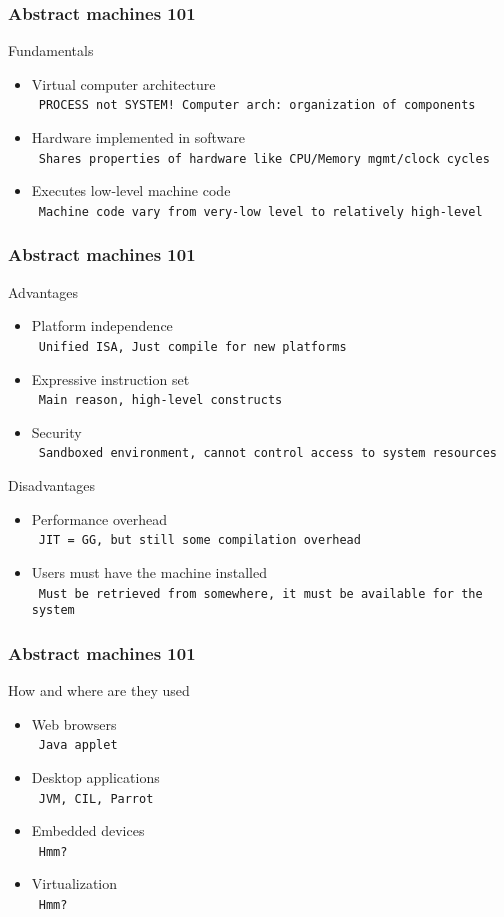 \documentclass[handout]{beamer}
\newcommand{\n}[1]{\\~\texttt{\color{red}\tiny #1}}
\begin{document}
\begin{frame}
  \frametitle{Abstract machines 101}

  Fundamentals

  \begin{itemize}[<+->]
  \item Virtual computer architecture
    \n{PROCESS not SYSTEM! Computer arch: organization of components}
  \item Hardware implemented in software
    \n{Shares properties of hardware like CPU/Memory mgmt/clock cycles}
  \item Executes low-level machine code
    \n{Machine code vary from very-low level to relatively high-level}
  \end{itemize}

\end{frame}

\begin{frame}
  \frametitle{Abstract machines 101}

  Advantages
  \begin{itemize}[<+->]
  \item Platform independence
    \n{Unified ISA, Just compile for new platforms}
  \item Expressive instruction set
    \n{Main reason, high-level constructs}
  \item Security
    \n{Sandboxed environment, cannot control access to system resources}
  \end{itemize}

  Disadvantages
  \begin{itemize}[<+->]
  \item Performance overhead
    \n{JIT = GG, but still some compilation overhead}
  \item Users must have the machine installed
    \n{Must be retrieved from somewhere, it must be available for the system}
  \end{itemize}

\end{frame}

\begin{frame}
  \frametitle{Abstract machines 101}

  How and where are they used
  \begin{itemize}[<+->]
  \item Web browsers
    \n{Java applet}
  \item Desktop applications
    \n{JVM, CIL, Parrot}
  \item Embedded devices
    \n{Hmm?}
  \item Virtualization
    \n{Hmm?}
  \end{itemize}

\end{frame}
\end{document}
